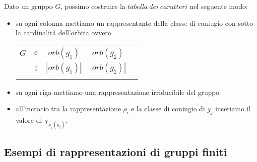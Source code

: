 \documentclass[11pt]{article}
\theoremstyle{plain}
\theoremstyle{definition}
\theoremstyle{remark}
\begin{document}
Dato un gruppo $G$, possimo costruire la $tabella\ dei\ caratteri$ nel seguente modo:
\begin{itemize}
\item su ogni colonna mettiamo un rappresentante della classe di coniugio con sotto la cardinalità dell'orbita ovvero

\begin{table}[!ht]
\centering
\begin{tabular}{|c|c|c|c|c}
\hline
$G$  & $e$ & $orb(g_1)$ & $orb(g_2)$ & \\
 & 1 & $|orb(g_1)|$ & $|orb(g_2)|$ & \\
\hline
 & &  & \\
\end{tabular}
\end{table}

\item su ogni riga mettiamo una rappresentazione irriducibile del gruppo
\item all'incrocio tra la rappresentazione $\rho_i$ e la classe di coniugio di $g_j$ inseriamo il valore di $\chi_{\rho_i(g_j)}$.


\end{itemize}



\subsection{Esempi di rappresentazioni di gruppi finiti}
\end{document}
